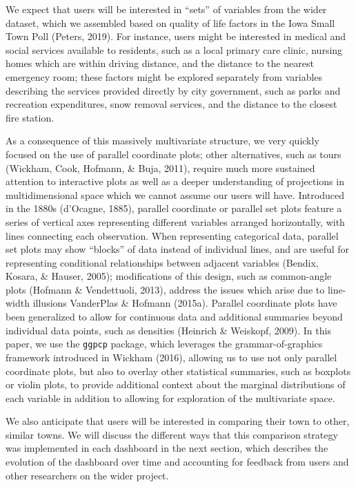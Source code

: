 \documentclass[print]{nuthesis}
\begin{document}
We expect that users will be interested in ``sets'' of variables from the wider dataset, which we assembled based on quality of life factors in the Iowa Small Town Poll (Peters, 2019). For instance, users might be interested in medical and social services available to residents, such as a local primary care clinic, nursing homes which are within driving distance, and the distance to the nearest emergency room; these factors might be explored separately from variables describing the services provided directly by city government, such as parks and recreation expenditures, snow removal services, and the distance to the closest fire station.

As a consequence of this massively multivariate structure, we very quickly focused on the use of parallel coordinate plots; other alternatives, such as tours (Wickham, Cook, Hofmann, \& Buja, 2011), require much more sustained attention to interactive plots as well as a deeper understanding of projections in multidimensional space which we cannot assume our users will have. Introduced in the 1880s (d'Ocagne, 1885), parallel coordinate or parallel set plots feature a series of vertical axes representing different variables arranged horizontally, with lines connecting each observation. When representing categorical data, parallel set plots may show ``blocks'' of data instead of individual lines, and are useful for representing conditional relationships between adjacent variables (Bendix, Kosara, \& Hauser, 2005); modifications of this design, such as common-angle plots (Hofmann \& Vendettuoli, 2013), address the issues which arise due to line-width illusions VanderPlas \& Hofmann (2015a). Parallel coordinate plots have been generalized to allow for continuous data and additional summaries beyond individual data points, such as densities (Heinrich \& Weiskopf, 2009). In this paper, we use the \texttt{ggpcp} package, which leverages the grammar-of-graphics framework introduced in Wickham (2016), allowing us to use not only parallel coordinate plots, but also to overlay other statistical summaries, such as boxplots or violin plots, to provide additional context about the marginal distributions of each variable in addition to allowing for exploration of the multivariate space.

We also anticipate that users will be interested in comparing their town to other, similar towns. We will discuss the different ways that this comparison strategy was implemented in each dashboard in the next section, which describes the evolution of the dashboard over time and accounting for feedback from users and other researchers on the wider project.
\end{document}

